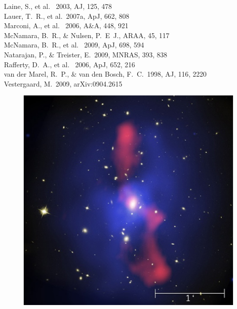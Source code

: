 \documentclass[12pt]{article}
\begin{document}
Laine, S., et al. \ 2003, AJ, 125, 478\\
Lauer, T.~R., et al.\ 2007a, ApJ, 662, 808 \\
Marconi, A., et al. \ 2006, A\&A, 448, 921 \\
McNamara, B.~R., \& Nulsen, P.~E~J., ARAA, 45, 117 \\
McNamara, B.~R., et al. \ 2009, ApJ, 698, 594 \\
Natarajan, P., \& Treister, E.\ 2009, MNRAS, 393, 838 \\
Rafferty, D.~A., et al. \ 2006, ApJ, 652, 216 \\
van der Marel, R.~P., \& van den Bosch, F.~C.\ 1998, AJ, 116, 2220 \\
Vestergaard, M.\ 2009, arXiv:0904.2615

\begin{figure}[ht]
  \begin{center}
    \begin{minipage}{0.47\linewidth}    
      \includegraphics*[width=\textwidth]{fig1}
    \end{minipage}
    \begin{minipage}{0.52\linewidth}    

\end{minipage}
\end{center}
\end{figure}
\end{document}
